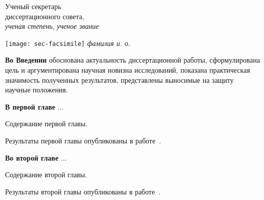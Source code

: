 \documentclass[%
autoref,     %
href,        %
colorlinks,  %
facsimile,   %
]{disser}
\begin{document}
\vfill\noindent
\begin{minipage}[b]{0.4\linewidth}
  Ученый секретарь\\
  диссертационного совета,\\
  \emph{ученая степень}, \emph{ученое звание}
\end{minipage}
\hfill
\makeatletter
\ifDis@facsimile
  \texttt{[image: sec-facsimile]}\hfill
\fi%
\makeatother%
\emph{фамилия и. о.}

\clearpage


\actualitysection
\actualitytext

\developmentsection
\developmenttext

\objectivesection
\objectivetext

\noveltysection
\noveltytext

{}

\methodssection
\methodstext

\resultssection
\resultstext

\approbationsection
\approbationtext

\pubsection
\pubtext

\contribsection
\contribtext

\structsection
\structtext


\textbf{Во Введении} обоснована актуальность диссертационной работы, сформулирована цель и аргументирована научная новизна исследований, показана практическая значимость полученных результатов, представлены выносимые на защиту научные положения.

\textbf{В первой главе} ...

Содержание первой главы.

Результаты первой главы опубликованы в работе~\cite{Ivanov_1999_Journal_17_173}.

\textbf{Во второй главе} ...

Содержание второй главы.

Результаты второй главы опубликованы в работе~\cite{Petrov_2001_Journal_23_12321}.
\end{document}
